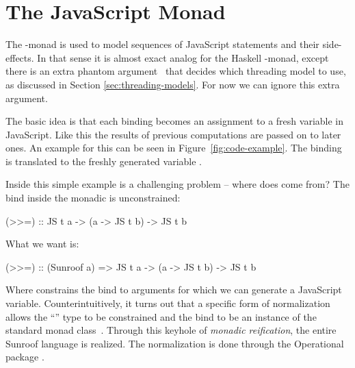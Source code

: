  
\section{The JavaScript Monad}
\label{sec:js-monad}

The \JS-monad is
used to model sequences of JavaScript statements and
their side-effects. In that sense it is almost
exact analog for the Haskell \IO-monad, except there
is an extra phantom argument~\cite{Leijen:99:Phantom} 
that decides which threading model to use, as
discussed in Section \ref{sec:threading-models}.
For now we can ignore this extra argument.

The basic idea is that each binding becomes an
assignment to a fresh variable in JavaScript. Like
this the results of previous computations are passed on to 
later ones.
An example for this can be seen in Figure~\ref{fig:code-example}.
The binding  is translated to the freshly generated
variable .

Inside this simple example is a challenging problem -- where does
 come from? The bind inside the monadic  is
unconstrained:
\begin{Code}
(>>=) :: JS t a -> (a -> JS t b) -> JS t b
\end{Code}
What we want is:
\begin{Code}
(>>=) :: (Sunroof a) => JS t a -> (a -> JS t b) -> JS t b
\end{Code}
Where  constrains the bind to
arguments for which we can generate a JavaScript variable.
Counterintuitively, 
it turns out that a specific form of normalization allows 
the ``'' type to be constrained and the bind to 
be an instance of the standard monad class~\cite{Sculthorpe:13:ConstrainedMonads}.
Through this keyhole of {\em monadic reification},
the entire Sunroof language is realized. The 
normalization is done through the Operational package 
\cite{Apfelmus:10:Operational,Hackage:10:Operational}.


